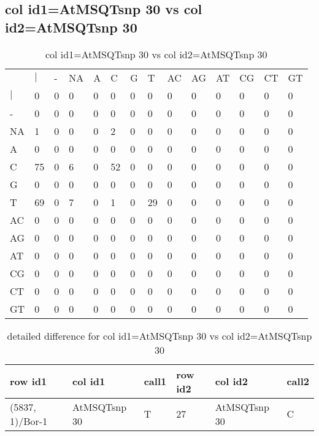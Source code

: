 \subsection{col id1=AtMSQTsnp 30 vs col id2=AtMSQTsnp 30}
\begin{center}
\begin{longtable}{|l|l|l|l|l|l|l|l|l|l|l|l|l|l|}
\caption{col id1=AtMSQTsnp 30 vs col id2=AtMSQTsnp 30} \label{table_dm636}\\
\hline
\\
\hline
&$|$&-&NA&A&C&G&T&AC&AG&AT&CG&CT&GT\\
$|$&0&0&0&0&0&0&0&0&0&0&0&0&0\\
-&0&0&0&0&0&0&0&0&0&0&0&0&0\\
NA&1&0&0&0&2&0&0&0&0&0&0&0&0\\
A&0&0&0&0&0&0&0&0&0&0&0&0&0\\
C&75&0&6&0&52&0&0&0&0&0&0&0&0\\
G&0&0&0&0&0&0&0&0&0&0&0&0&0\\
T&69&0&7&0&1&0&29&0&0&0&0&0&0\\
AC&0&0&0&0&0&0&0&0&0&0&0&0&0\\
AG&0&0&0&0&0&0&0&0&0&0&0&0&0\\
AT&0&0&0&0&0&0&0&0&0&0&0&0&0\\
CG&0&0&0&0&0&0&0&0&0&0&0&0&0\\
CT&0&0&0&0&0&0&0&0&0&0&0&0&0\\
GT&0&0&0&0&0&0&0&0&0&0&0&0&0\\
\hline
\end{longtable}
\end{center}

\begin{center}
\begin{longtable}{|l|l|l|l|l|l|}
\caption{detailed difference for col id1=AtMSQTsnp 30 vs col id2=AtMSQTsnp 30} \label{table_dm637}\\
\hline
row id1&col id1&call1&row id2&col id2&call2\\
\hline
(5837, 1)/Bor-1&AtMSQTsnp 30&T&27&AtMSQTsnp 30&C\\
\hline
\end{longtable}
\end{center}

